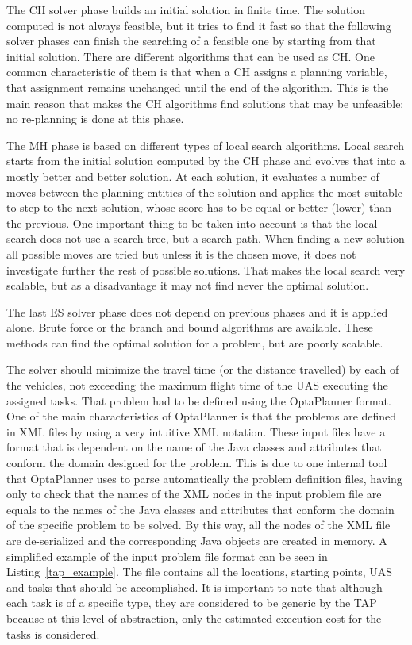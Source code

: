 \documentclass[twocolumn]{svjour3}          %
\begin{document}
The CH solver phase builds an initial solution in finite time. The solution computed is not always feasible, but it tries to find it fast so that the following solver phases can finish the searching of a feasible one by starting from that initial solution. There are different algorithms that can be used as CH. One common characteristic of them is that when a CH assigns a planning variable, that assignment remains unchanged until the end of the algorithm. This is the main reason that makes the CH algorithms find solutions that may be unfeasible: no re-planning is done at this phase.

The MH phase is based on different types of local search algorithms. Local search starts from the initial solution computed by the CH phase and evolves that into a mostly better and better solution. At each solution, it evaluates a number of moves between the planning entities of the solution and applies the most suitable to step to the next solution, whose score has to be equal or better (lower) than the previous. One important thing to be taken into account is that the local search does not use a search tree, but a search path. When finding a new solution all possible moves are tried but unless it is the chosen move, it does not investigate further the rest of possible solutions. That makes the local search very scalable, but as a disadvantage it may not find never the optimal solution.

The last ES solver phase does not depend on previous phases and it is applied alone. Brute force or the branch and bound algorithms are available. These methods can find the optimal solution for a problem, but are poorly scalable.

The solver should minimize the travel time (or the distance travelled) by each of the vehicles, not exceeding the maximum flight time of the UAS executing the assigned tasks. That problem had to be defined using the OptaPlanner format. One of the main characteristics of OptaPlanner is that the problems are defined in XML files by using a very intuitive XML notation. These input files have a format that is dependent on the name of the Java classes and attributes that conform the domain designed for the problem. This is due to one internal tool that OptaPlanner uses to parse automatically the problem definition files, having only to check that the names of the XML nodes in the input problem file are equals to the names of the Java classes and attributes that conform the domain of the specific problem to be solved. By this way, all the nodes of the XML file are de-serialized and the corresponding Java objects are created in memory. A simplified example of the input problem file format can be seen in Listing~\ref{tap_example}. The file contains all the locations, starting points, UAS and tasks that should be accomplished. It is important to note that although each task is of a specific type, they are considered to be generic by the TAP because at this level of abstraction, only the estimated execution cost for the tasks is considered.
\end{document}
